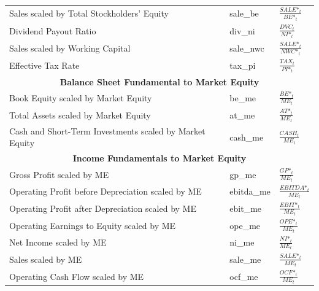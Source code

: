\documentclass[12pt,title,fleqn]{article}
\begin{document}
{\begin{longtable}{@{\extracolsep{\fill}}|p{6cm}|l|p{8cm}|@{}}
	Sales scaled by Total Stockholders' Equity & sale\_be &$\frac{SALE\mbox{*}_t}{BE\mbox{*}_t}$ \\
	
	Dividend Payout Ratio & div\_ni &$\frac{DVC_t}{NI\mbox{*}_t}$ \\
	
	Sales scaled by Working Capital & sale\_nwc &$\frac{SALE\mbox{*}_t}{NWC\mbox{*}_t}$\\
	
	Effective Tax Rate & tax\_pi &$ \frac{TAX_t}{PI\mbox{*}_t}$ \\
	
    \hline 
	\multicolumn{3}{|c|}{\textbf{Balance Sheet Fundamental to Market Equity}} \\
	\hline   	
	
	Book Equity scaled by Market Equity & be\_me &$\frac{BE\mbox{*}_t}{ME_t}$\\
	
	Total Assets scaled by Market Equity & at\_me &$ \frac{AT\mbox{*}_t}{ME_t}$\\
	
	Cash and Short-Term Investments scaled by Market Equity & cash\_me &$\frac{CASH_t}{ME_t}$\\
	
    \hline 
	\multicolumn{3}{|c|}{\textbf{Income Fundamentals to Market Equity}} \\
	\hline  	
    
    Gross Profit scaled by ME & gp\_me &$\frac{GP\mbox{*}_t}{ME_t}$ \\
	
	Operating Profit before Depreciation scaled by ME & ebitda\_me &$\frac{EBITDA\mbox{*}_t}{ME_t}$\\
	
	Operating Profit after Depreciation scaled by ME & ebit\_me &$\frac{EBIT\mbox{*}_t}{ME_t}$\\
	
	Operating Earnings to Equity scaled by ME & ope\_me &$\frac{OPE\mbox{*}_t}{ME_t}$\\
	
	Net Income scaled by ME & ni\_me &$\frac{NI\mbox{*}_t}{ME_t}$ \\
	
	Sales scaled by ME & sale\_me &$\frac{SALE\mbox{*}_t}{ME_t}$\\
	
	Operating Cash Flow scaled by ME & ocf\_me &$\frac{OCF\mbox{*}_t}{ME_t}$\\
	

\end{longtable}}
\end{document}
